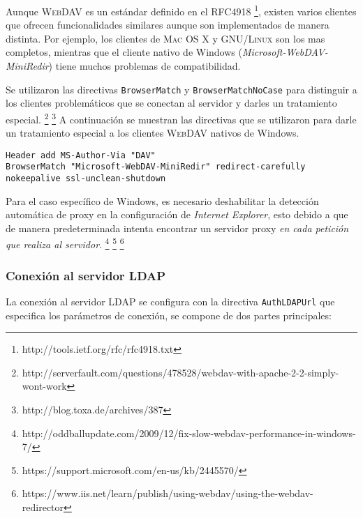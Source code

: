 Aunque \textsc{WebDAV} es un est\'{a}ndar definido en el RFC4918 \footnote{http://tools.ietf.org/rfc/rfc4918.txt}, existen varios clientes que ofrecen funcionalidades similares aunque son implementados de manera distinta. Por ejemplo, los clientes de \textsc{Mac OS X} y \textsc{GNU/Linux} son los mas completos, mientras que el cliente nativo de Windows (\textit{Microsoft-WebDAV-MiniRedir}) tiene muchos problemas de compatibilidad.

Se utilizaron las directivas \texttt{BrowserMatch} y \texttt{BrowserMatchNoCase} para distinguir a los clientes problem\'{a}ticos que se conectan al servidor y darles un tratamiento especial. \footnote{http://serverfault.com/questions/478528/webdav-with-apache-2-2-simply-wont-work} \footnote{http://blog.toxa.de/archives/387} A continuaci\'{o}n se muestran las directivas que se utilizaron para darle un tratamiento especial a los clientes \textsc{WebDAV} nativos de Windows.

{
\scriptsize
\linespread{1}
\begin{verbatim}
Header add MS-Author-Via "DAV" 
BrowserMatch "Microsoft-WebDAV-MiniRedir" redirect-carefully nokeepalive ssl-unclean-shutdown 
\end{verbatim}
}

Para el caso espec\'{i}fico de Windows, es necesario deshabilitar la detecci\'{o}n autom\'{a}tica de proxy en la configuraci\'{o}n de \textit{Internet Explorer}, esto debido a que de manera predeterminada intenta encontrar un servidor proxy \textit{en cada petici\'{o}n que realiza al servidor}.
\footnote{http://oddballupdate.com/2009/12/fix-slow-webdav-performance-in-windows-7/}
\footnote{https://support.microsoft.com/en-us/kb/2445570/}
\footnote{https://www.iis.net/learn/publish/using-webdav/using-the-webdav-redirector}

        \subsubsection {Conexi\'{o}n al servidor \textsc{LDAP}}

La conexi\'{o}n al servidor LDAP se configura con la directiva \texttt{AuthLDAPUrl} que especifica los par\'{a}metros de conexi\'{o}n, se compone de dos partes principales:

{
 \begin{table}[H]
 \caption{Par\'{a}metros de conexi\'{o}n \texttt{LDAP}}{}
 \label{tab:ldap-parameters}
 \noindent{} %
 \end{table}
}

